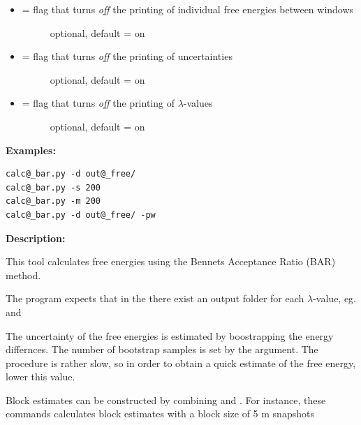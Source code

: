 \documentclass[letterpaper,10pt,english]{manual}
\begin{document}
\begin{itemize}
\begin{description}
\end{description}

\item {} \begin{description}
\item[{  = flag that turns \emph{off} the printing of individual free energies between windows}] \leavevmode
optional, default = on

\end{description}

\item {} \begin{description}
\item[{  = flag that turns \emph{off} the printing of uncertainties}] \leavevmode
optional, default = on

\end{description}

\item {} \begin{description}
\item[{  = flag that turns \emph{off} the printing of $\lambda$-values}] \leavevmode
optional, default = on

\end{description}

\end{itemize}

\textbf{Examples:}

\begin{Verbatim}[commandchars=@\[\]]
calc@_bar.py -d out@_free/
calc@_bar.py -s 200
calc@_bar.py -m 200
calc@_bar.py -d out@_free/ -pw
\end{Verbatim}

\textbf{Description:}

This tool calculates free energies using the Bennets Acceptance Ratio (BAR) method.

The program expects that in the  there exist an output folder for each $\lambda$-value, eg.  and 

The uncertainty of the free energies is estimated by boostrapping the energy differnces. The number of bootstrap samples is set by the  argument. The procedure is rather slow, so in order to obtain a quick estimate of the free energy, lower this value.

Block estimates can be constructed by combining  and . For instance, these commands calculates block estimates with a block size of 5 m snapshots
\end{document}
